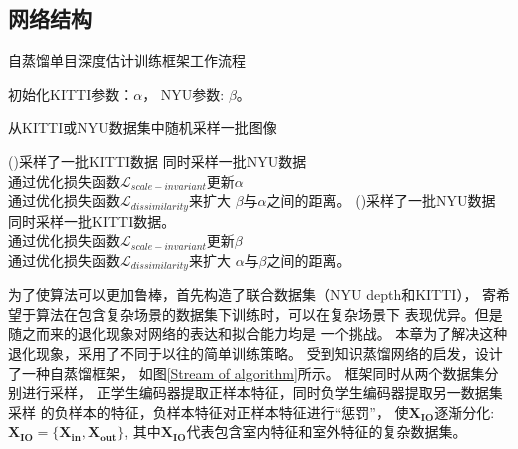 \subsection{网络结构}
\begin{algorithm*}[tbh]
  \caption{自蒸馏单目深度估计训练框架工作流程}

      初始化KITTI参数：$\alpha$，
      NYU参数: $\beta$。
      
      {从KITTI或NYU数据集中随机采样一批图像

        \If(){采样了一批KITTI数据}{
          同时采样一批NYU数据\\
        通过优化损失函数$\mathcal{L}_{scale-invariant}$更新$\alpha$\\
        通过优化损失函数$\mathcal{L}_{dissimilarity}$来扩大
        $\beta$与$\alpha$之间的距离。
        }
        \If(){采样了一批NYU数据}{
          同时采样一批KITTI数据。\\
        通过优化损失函数$\mathcal{L}_{scale-invariant}$更新$\beta$\\
        通过优化损失函数$\mathcal{L}_{dissimilarity}$来扩大
        $\alpha$与$\beta$之间的距离。
        }
      }
  \label{alg:backbone_alg}
  \end{algorithm*}
为了使算法可以更加鲁棒，首先构造了联合数据集（NYU depth和KITTI），
寄希望于算法在包含复杂场景的数据集下训练时，可以在复杂场景下
表现优异。但是随之而来的退化现象对网络的表达和拟合能力均是
一个挑战。
本章为了解决这种退化现象，采用了不同于以往的简单训练策略。
受到知识蒸馏网络的启发，设计了一种自蒸馏框架，
如图\ref{Stream of algorithm}所示。
框架同时从两个数据集分别进行采样，
正学生编码器提取正样本特征，同时负学生编码器提取另一数据集采样
的负样本的特征，负样本特征对正样本特征进行“惩罚”，
使$\mathbf{X_{IO}}$逐渐分化:
$\mathbf{X_{IO}} = \{\mathbf{X_{in}},\mathbf{X_{out}}\}$,
其中$\mathbf{X_{IO}}$代表包含室内特征和室外特征的复杂数据集。

